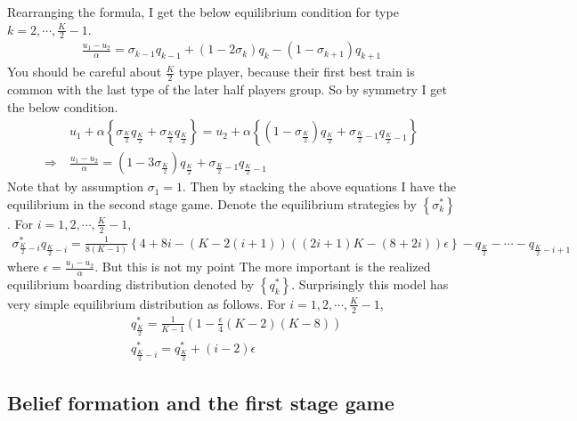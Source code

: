 \documentclass{article}
\begin{document}
Rearranging the formula, I get the below equilibrium condition for type $k = 2, \cdots, \frac{K}{2} -1$.
\begin{align*}
	\frac{u_1 - u_2}{\alpha} = \sigma_{k-1} q_{k-1} + (1 - 2 \sigma_{k}) q_k - (1-\sigma_{k+1}) q_{k + 1}
\end{align*}
You should be careful about $\frac{K}{2}$ type player, because their first best train is common with the last type of the later half players group. So by symmetry I get the below condition.
\begin{align*}
	&u_1 + \alpha \left\{ \sigma_{\frac{K}{2}} q_{\frac{K}{2}} + \sigma_{\frac{K}{2}} q_{\frac{K}{2}} \right\} = u_2 + \alpha \left\{ (1-\sigma_{\frac{K}{2}}) q_{\frac{K}{2}} + \sigma_{\frac{K}{2}-1} q_{\frac{K}{2}-1} \right\}\\[8pt]
	\Rightarrow\ &\frac{u_1 -u_2}{\alpha} = (1 - 3 \sigma_{\frac{K}{2}}) q_{\frac{K}{2}} +  \sigma_{\frac{K}{2}-1} q_{\frac{K}{2}-1}
\end{align*}
Note that by assumption $\sigma_1 = 1$. Then by stacking the above equations I have the equilibrium in the second stage game. Denote the equilibrium strategies by $\left\{ \sigma_k^{*} \right\}$. For $i = 1, 2, \cdots, \frac{K}{2} -1$,
\begin{align*}
	\sigma_{\frac{K}{2} -i}^{*} q_{\frac{K}{2} -i} = \frac{1}{8(K-1)} \left\{ 4 + 8i - (K - 2(i + 1))((2i+1)K - (8+2i))\epsilon \right\} - q_{\frac{K}{2}} - \cdots - q_{\frac{K}{2} - i + 1}
\end{align*}
where $\epsilon = \frac{u_1 - u_2}{\alpha}$. But this is not my point The more important is the realized equilibrium boarding distribution denoted by $\left\{ q_k^{*} \right\}$. Surprisingly this model has very simple equilibrium distribution as follows. For $i = 1, 2, \cdots, \frac{K}{2} -1$,
\begin{align*}
	&q_{\frac{K}{2}}^{*} = \frac{1}{K-1} \left( 1 - \frac{\epsilon}{4} (K-2)(K-8) \right)\\[8pt]
	&q_{\frac{K}{2} - i}^{*} = q_{\frac{K}{2}}^{*} + (i-2) \epsilon
\end{align*}

\subsection{Belief formation and the first stage game}
\end{document}
